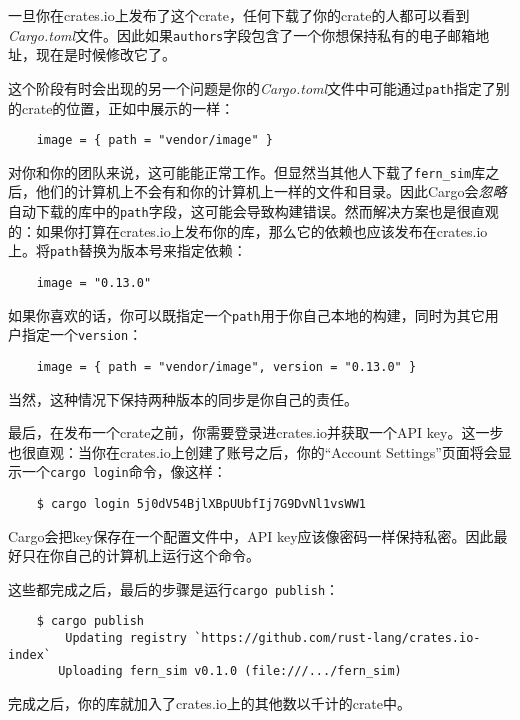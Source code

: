 \begin{note}
    一旦你在crates.io上发布了这个crate，任何下载了你的crate的人都可以看到\emph{Cargo.toml}文件。因此如果\texttt{authors}字段包含了一个你想保持私有的电子邮箱地址，现在是时候修改它了。
\end{note}

这个阶段有时会出现的另一个问题是你的\emph{Cargo.toml}文件中可能通过\texttt{path}指定了别的crate的位置，正如中展示的一样：
\begin{verbatim}
    image = { path = "vendor/image" }
\end{verbatim}

对你和你的团队来说，这可能能正常工作。但显然当其他人下载了\texttt{fern\_sim}库之后，他们的计算机上不会有和你的计算机上一样的文件和目录。因此Cargo会\emph{忽略}自动下载的库中的\texttt{path}字段，这可能会导致构建错误。然而解决方案也是很直观的：如果你打算在crates.io上发布你的库，那么它的依赖也应该发布在crates.io上。将\texttt{path}替换为版本号来指定依赖：
\begin{verbatim}
    image = "0.13.0"
\end{verbatim}

如果你喜欢的话，你可以既指定一个\texttt{path}用于你自己本地的构建，同时为其它用户指定一个\texttt{version}：
\begin{verbatim}
    image = { path = "vendor/image", version = "0.13.0" }
\end{verbatim}

当然，这种情况下保持两种版本的同步是你自己的责任。

最后，在发布一个crate之前，你需要登录进crates.io并获取一个API key。这一步也很直观：当你在crates.io上创建了账号之后，你的“Account Settings”页面将会显示一个\texttt{cargo login}命令，像这样：
\begin{verbatim}
    $ cargo login 5j0dV54BjlXBpUUbfIj7G9DvNl1vsWW1
\end{verbatim}

Cargo会把key保存在一个配置文件中，API key应该像密码一样保持私密。因此最好只在你自己的计算机上运行这个命令。

这些都完成之后，最后的步骤是运行\texttt{cargo publish}：
\begin{verbatim}
    $ cargo publish
        Updating registry `https://github.com/rust-lang/crates.io-index`
       Uploading fern_sim v0.1.0 (file:///.../fern_sim)
\end{verbatim}

完成之后，你的库就加入了crates.io上的其他数以千计的crate中。

